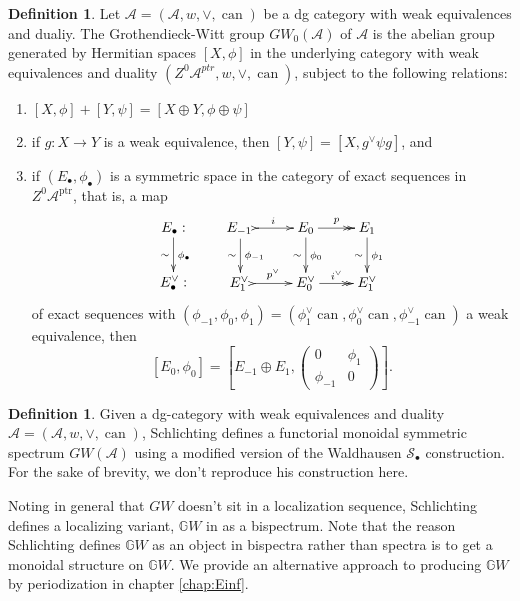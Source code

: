 \documentclass[edeposit,fullpage]{uiucthesis2009}
\newcommand{\mbb}{\mathbb}
\newcommand{\mc}{\mathcal}
\newcommand{\ptr}{\mathrm{ptr}}
\DeclareMathOperator{\can}{can}
\theoremstyle{plain}
\numberwithin{lemma}{section}
\theoremstyle{definition}
\newtheorem{definition}[lemma]{Definition}
\begin{document}
\begin{definition}
Let $\mathscr A = (\mc A,w,\vee,\can)$ be a dg category with weak
equivalences and dualiy. The Grothendieck-Witt group $GW_0(\mathscr
A)$ of $\mathscr A$ is the abelian group generated by Hermitian spaces
$[X,\phi]$ in the underlying category with weak equivalences and
duality $(Z^0\mc A^{ptr},w,\vee,\can)$, subject to the following
relations:
\begin{enumerate}
\item $[X,\phi] + [Y,\psi] = [X \oplus Y,\phi \oplus \psi]$
\item if $g : X \rightarrow Y$ is a weak equivalence, then $[Y,\psi] =
  [X,g^\vee \psi g]$, and
\item if $(E_\bullet,\phi_\bullet)$ is a symmetric space in the
  category of exact sequences in $Z^0\mc A^\ptr$, that is, a map
\[
\xymatrix{E_\bullet :  \ar[d]_\sim^{\phi_\bullet} \\ E^\vee_\bullet :}
\qquad \xymatrix{E_{-1} \, \ar@{>->}[r]^i \ar[d]_\sim^{\phi_{-1}} &
  E_0 \ar@{->>}[r]^p \ar[d]_\sim^{\phi_0} & E_1 \ar[d]_\sim^{\phi_1}
  \\
E_{1}^\vee \, \ar@{>->}[r]^{p^\vee} &
  E_0^\vee \ar@{->>}[r]^{i^\vee} & E_1^\vee }
\]
of exact sequences with $(\phi_{-1},\phi_0,\phi_1) = (\phi_1^\vee
\can, \phi_0^\vee \can, \phi^\vee_{-1}\can)$ a weak equivalence, then
\[
[E_0,\phi_0] = \left[E_{-1} \oplus E_1, \begin{pmatrix}
0 & \phi_1\\
\phi_{-1} & 0
\end{pmatrix} \right].
\]
\end{enumerate}
\end{definition}

\begin{definition}\label{def:GW_spectra}
Given a dg-category with weak equivalences and duality $\mathscr A = (\mc A,w,\vee,\can)$, Schlichting
defines \cite[Section 4.1]{Schder}  a functorial monoidal symmetric spectrum
$GW(\mathscr A)$ using a modified version of the Waldhausen $\mc
S_\bullet$ construction. For the sake of brevity, we don't reproduce
his construction here. 

Noting in general that $GW$ doesn't sit in a localization sequence,
Schlichting defines a localizing variant, $\mbb GW$ in \cite[Section
8.1]{Schder} as a bispectrum. Note that the reason Schlichting defines
$\mbb GW$ as an object in bispectra rather than spectra is to get a monoidal structure
on $\mbb GW$. We provide an alternative approach to producing $\mbb
GW$ by periodization in chapter \ref{chap:Einf}. 
\end{definition}
\end{document}
